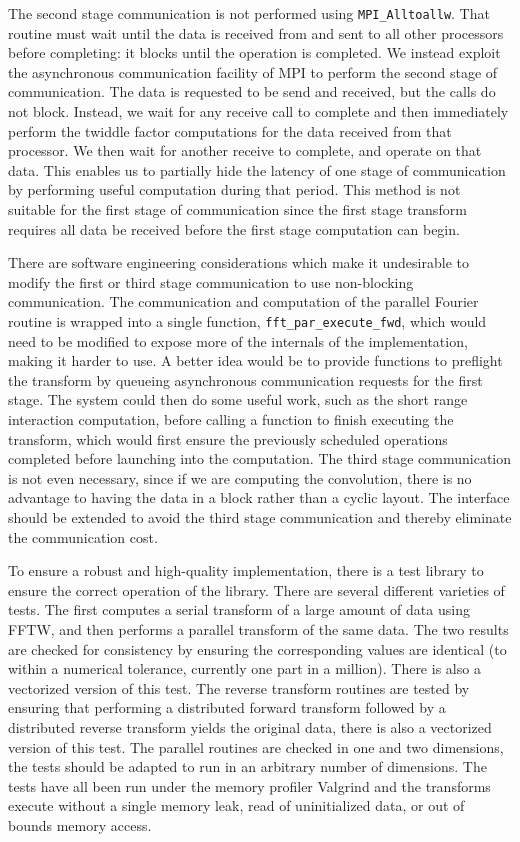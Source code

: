 \documentclass{article}
\theoremstyle{definition}
\begin{document}
The second stage communication is not performed using \texttt{MPI\_Alltoallw}.
That routine must wait until the data is received from and sent to all other
processors before completing: it blocks until the operation is completed. We
instead exploit the asynchronous communication facility of MPI to perform the
second stage of communication. The data is requested to be send and received,
but the calls do not block. Instead, we wait for any receive call to complete
and then immediately perform the twiddle factor computations for the data
received from that processor. We then wait for another receive to complete, and
operate on that data. This enables us to partially hide the latency of one stage
of communication by performing useful computation during that period.
This method is not suitable for the first stage of communication since the first
stage transform requires all data be received before the first stage computation
can begin.

There are software engineering considerations which make it undesirable to
modify the first or third stage communication to use non-blocking communication.
The communication and computation of the parallel Fourier routine is wrapped
into a single function, \texttt{fft\_par\_execute\_fwd}, which would need to be
modified to expose more of the internals of the implementation, making it harder
to use. A better idea would be to provide functions to preflight the transform
by queueing asynchronous communication requests for the first stage. The system
could then do some useful work, such as the short range interaction computation,
before calling a function to finish executing the transform, which would first
ensure the previously scheduled operations completed before launching into the
computation. The third stage communication is not even necessary, since if we
are computing the convolution, there is no advantage to having the data in a
block rather than a cyclic layout. The interface should be extended to avoid the
third stage communication and thereby eliminate the communication cost.

To ensure a robust and high-quality implementation, there is a test library to
ensure the correct operation of the library. There are several different
varieties of tests. The first computes a serial transform of a large amount of
data using FFTW, and then performs a parallel transform of the same data. The
two results are checked for consistency by ensuring the corresponding values are
identical (to within a numerical tolerance, currently one part in a million).
There is also a vectorized version of this test. The reverse transform routines
are tested by ensuring that performing a distributed forward transform followed
by a distributed reverse transform yields the original data, there is also a
vectorized version of this test. The parallel routines are checked in one and
two dimensions, the tests should be adapted to run in an arbitrary number of
dimensions. The tests have all been run under the memory profiler Valgrind and
the transforms execute without a single memory leak, read of uninitialized data,
or out of bounds memory access.
\end{document}

